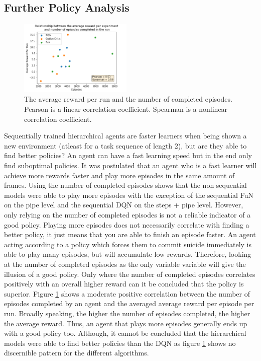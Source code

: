 \documentclass[notitlepage,a4paper,11pt]{article}
\begin{document}
\subsection{Further Policy Analysis}
\begin{figure}
\vspace{-40pt}
  \begin{center}
    \includegraphics[width=0.48\textwidth]{figs/good_policy.png}
  \end{center}
  \vspace{-20pt}
  \caption{The average reward per run and the number of completed episodes. Pearson is a linear correlation coefficient. Spearman is a nonlinear correlation coefficient.}
  \label{fig:good_policy}
\end{figure}

Sequentially trained hierarchical agents are faster learners when being shown a new environment (atleast for a task sequence of length 2), but are they able to find better policies? An agent can have a fast learning speed but in the end only find suboptimal policies. It was postulated that an agent who is a fast learner will achieve more rewards faster and play more episodes in the same amount of frames. Using the number of completed episodes shows that the non sequential models were able to play more episodes with the exception of the sequential FuN on the pipe level and the sequential DQN on the steps + pipe level. However, only relying on the number of completed episodes is not a reliable indicator of a good policy. Playing more episodes does not necessarily correlate with finding a better policy, it just means that you are able to finish an episode faster. An agent acting according to a policy which forces them to commit suicide immediately is able to play many episodes, but will accumulate low rewards. Therefore, looking at the number of completed episodes as the only variable variable will give the illusion of a good policy. Only where the number of completed episodes correlates positively with an overall higher reward can it be concluded that the policy is superior. Figure \ref{fig:good_policy} shows a moderate positive correlation between the number of episodes completed by an agent and the averaged average reward per episode per run. Broadly speaking, the higher the number of episodes completed, the higher the average reward. Thus, an agent that plays more episodes generally ends up with a good policy too. Although, it cannot be concluded that the hierarchical models were able to find better policies than the DQN as figure \ref{fig:good_policy} shows no discernible pattern for the different algorithms.  
\end{document}
